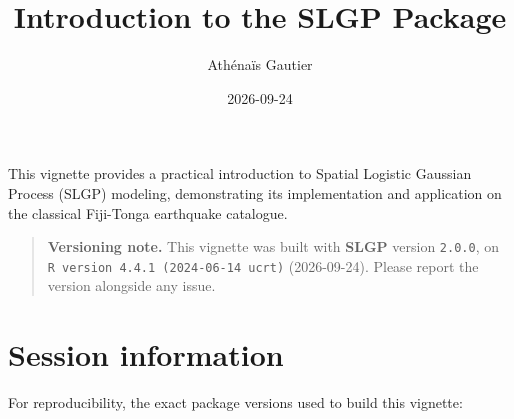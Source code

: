 \documentclass[
]{article}
\title{Introduction to the SLGP Package}
\author{Athénaïs Gautier}
\date{2026-09-24}
\begin{document}
\maketitle

This vignette provides a practical introduction to Spatial Logistic Gaussian Process (SLGP) modeling, demonstrating its implementation and application on the classical Fiji-Tonga earthquake catalogue.

\begin{quote}
\textbf{Versioning note.} This vignette was built with \textbf{SLGP} version \texttt{2.0.0}, on \texttt{R\ version\ 4.4.1\ (2024-06-14\ ucrt)} (2026-09-24). Please report the version alongside any issue.
\end{quote}

\section{Session information}\label{session-information}

For reproducibility, the exact package versions used to build this vignette:
\end{document}
